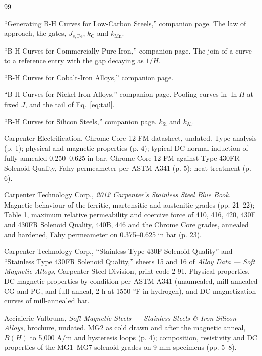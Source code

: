 \documentclass[
  11pt,
]{article}
\begin{document}
\begin{thebibliography}{99}\label{references}

 ``Generating B-H Curves for Low-Carbon Steels,'' companion page. The law of approach, the gates, \(J_{s,\mathrm{Fe}}\), \(k_\mathrm{C}\) and \(k_\mathrm{Mn}\).

 ``B-H Curves for Commercially Pure Iron,'' companion page. The join of a curve to a reference entry with the gap decaying as \(1/H\).

 ``B-H Curves for Cobalt-Iron Alloys,'' companion page.

 ``B-H Curves for Nickel-Iron Alloys,'' companion page. Pooling curves in \(\ln H\) at fixed \(J\), and the tail of Eq.~\eqref{eq:tail}.

 ``B-H Curves for Silicon Steels,'' companion page. \(k_\mathrm{Si}\) and \(k_\mathrm{Al}\).

 Carpenter Electrification, Chrome Core 12-FM datasheet, undated. Type analysis (p. 1); physical and magnetic properties (p. 4); typical DC normal induction of fully annealed 0.250--0.625 in bar, Chrome Core 12-FM against Type 430FR Solenoid Quality, Fahy permeameter per ASTM A341 (p. 5); heat treatment (p. 6).

 Carpenter Technology Corp., \emph{2012 Carpenter's Stainless Steel Blue Book}. Magnetic behaviour of the ferritic, martensitic and austenitic grades (pp. 21--22); Table 1, maximum relative permeability and coercive force of 410, 416, 420, 430F and 430FR Solenoid Quality, 440B, 446 and the Chrome Core grades, annealed and hardened, Fahy permeameter on 0.375--0.625 in bar (p. 23).

 Carpenter Technology Corp., ``Stainless Type 430F Solenoid Quality'' and ``Stainless Type 430FR Solenoid Quality,'' sheets 15 and 16 of \emph{Alloy Data --- Soft Magnetic Alloys}, Carpenter Steel Division, print code 2-91. Physical properties, DC magnetic properties by condition per ASTM A341 (unannealed, mill annealed CG and PG, and full anneal, 2 h at 1550 °F in hydrogen), and DC magnetization curves of mill-annealed bar.

 Acciaierie Valbruna, \emph{Soft Magnetic Steels --- Stainless Steels \& Iron Silicon Alloys}, brochure, undated. MG2 as cold drawn and after the magnetic anneal, \(B(H)\) to 5,000 A/m and hysteresis loops (p. 4); composition, resistivity and DC properties of the MG1--MG7 solenoid grades on 9 mm specimens (pp. 5--8).


\end{thebibliography}
\end{document}
